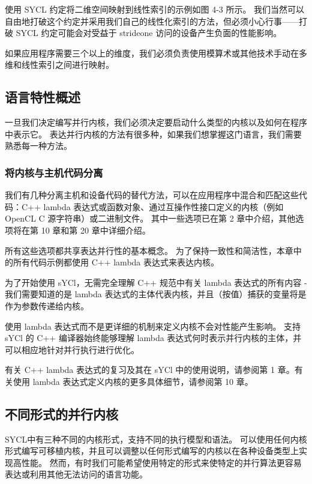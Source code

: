 使用 SYCL 约定将二维空间映射到线性索引的示例如图 4-3 所示。 我们当然可以自由地打破这个约定并采用我们自己的线性化索引的方法，但必须小心行事——打破 SYCL 约定可能会对受益于 strideone 访问的设备产生负面的性能影响。

如果应用程序需要三个以上的维度，我们必须负责使用模算术或其他技术手动在多维和线性索引之间进行映射。

\subsection{语言特性概述}
一旦我们决定编写并行内核，我们必须决定要启动什么类型的内核以及如何在程序中表示它。 表达并行内核的方法有很多种，如果我们想掌握这门语言，我们需要熟悉每一种方法。

\subsubsection{将内核与主机代码分离}
我们有几种分离主机和设备代码的替代方法，可以在应用程序中混合和匹配这些代码：C++ lambda 表达式或函数对象、通过互操作性接口定义的内核（例如 OpenCL C 源字符串）或二进制文件。 其中一些选项已在第 2 章中介绍，其他选项将在第 10 章和第 20 章中详细介绍。

所有这些选项都共享表达并行性的基本概念。 为了保持一致性和简洁性，本章中的所有代码示例都使用 C++ lambda 表达式来表达内核。

\begin{remark}
	为了开始使用 sYCl，无需完全理解 C++ 规范中有关 lambda 表达式的所有内容 - 我们需要知道的是 lambda 表达式的主体代表内核，并且（按值）捕获的变量将是 作为参数传递给内核。

使用 lambda 表达式而不是更详细的机制来定义内核不会对性能产生影响。 支持 sYCl 的 C++ 编译器始终能够理解 lambda 表达式何时表示并行内核的主体，并可以相应地针对并行执行进行优化。

有关 C++ lambda 表达式的复习及其在 sYCl 中的使用说明，请参阅第 1 章。有关使用 lambda 表达式定义内核的更多具体细节，请参阅第 10 章。
\end{remark}

\subsection{不同形式的并行内核}
SYCL中有三种不同的内核形式，支持不同的执行模型和语法。 可以使用任何内核形式编写可移植内核，并且可以调整以任何形式编写的内核以在各种设备类型上实现高性能。 然而，有时我们可能希望使用特定的形式来使特定的并行算法更容易表达或利用其他无法访问的语言功能。

